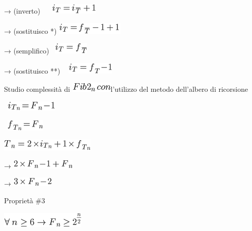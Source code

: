 \documentclass{article}
\begin{document}
{→ (inverto) ~ ~}\includegraphics{images/image48.png}{~ }

{→ (sostituisco }{*}{) }\includegraphics{images/image49.png}

{→ (semplifico) ~}\includegraphics{images/image50.png}{~ }

{→ (sostituisco }{**}{) ~ }\includegraphics{images/image38.png}

{}

{Studio complessità di }\includegraphics{images/image51.png}{l'utilizzo
del metodo dell'albero di ricorsione}

{}

{~}\includegraphics{images/image52.png}

{~}\includegraphics{images/image53.png}

{}

\includegraphics{images/image54.png}

{→ }\includegraphics{images/image55.png}

{→ }\includegraphics{images/image56.png}{~}

{Proprietà \#3}

{}

\includegraphics{images/image57.png}
\end{document}
